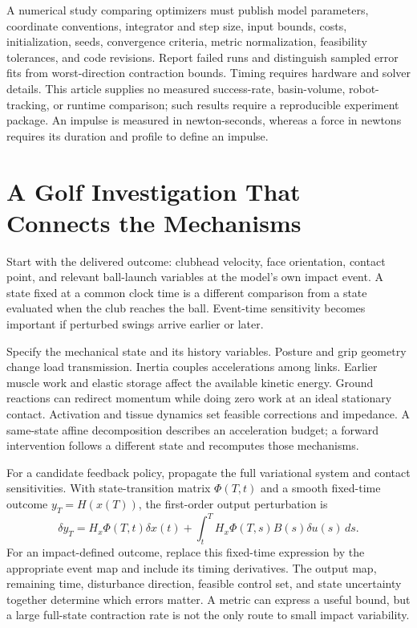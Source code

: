 \documentclass[
  10pt,
  letterpaper,
  DIV=11,
  numbers=noendperiod]{scrartcl}
\begin{document}
A numerical study comparing optimizers must publish model parameters,
coordinate conventions, integrator and step size, input bounds, costs,
initialization, seeds, convergence criteria, metric normalization,
feasibility tolerances, and code revisions. Report failed runs and
distinguish sampled error fits from worst-direction contraction bounds.
Timing requires hardware and solver details. This article supplies no
measured success-rate, basin-volume, robot-tracking, or runtime
comparison; such results require a reproducible experiment package. An
impulse is measured in newton-seconds, whereas a force in newtons
requires its duration and profile to define an impulse.

\section{A Golf Investigation That Connects the
Mechanisms}\label{a-golf-investigation-that-connects-the-mechanisms}

Start with the delivered outcome: clubhead velocity, face orientation,
contact point, and relevant ball-launch variables at the model's own
impact event. A state fixed at a common clock time is a different
comparison from a state evaluated when the club reaches the ball.
Event-time sensitivity becomes important if perturbed swings arrive
earlier or later.

Specify the mechanical state and its history variables. Posture and grip
geometry change load transmission. Inertia couples accelerations among
links. Earlier muscle work and elastic storage affect the available
kinetic energy. Ground reactions can redirect momentum while doing zero
work at an ideal stationary contact. Activation and tissue dynamics set
feasible corrections and impedance. A same-state affine decomposition
describes an acceleration budget; a forward intervention follows a
different state and recomputes those mechanisms.

For a candidate feedback policy, propagate the full variational system
and contact sensitivities. With state-transition matrix \(\Phi(T,t)\)
and a smooth fixed-time outcome \(y_T=H(x(T))\), the first-order output
perturbation is \[
\delta y_T=H_x\Phi(T,t)\delta x(t)
+\int_t^T H_x\Phi(T,s)B(s)\delta u(s)\,ds.
\] For an impact-defined outcome, replace this fixed-time expression by
the appropriate event map and include its timing derivatives. The output
map, remaining time, disturbance direction, feasible control set, and
state uncertainty together determine which errors matter. A metric can
express a useful bound, but a large full-state contraction rate is not
the only route to small impact variability.
\end{document}
